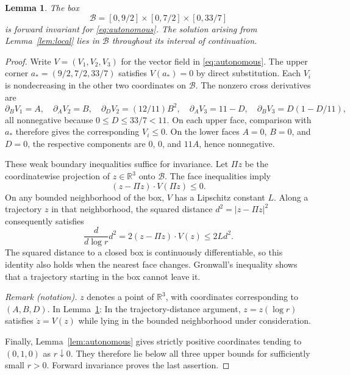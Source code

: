 \documentclass[11pt]{article}
\newcommand{\R}{\mathbb R}
\newtheorem{lemma}[theorem]{Lemma}
\theoremstyle{remark}
\begin{document}
\begin{lemma}\label{lem:box}
The box
\begin{equation}\label{eq:box}
 \mathcal B=[0,9/2]\times[0,7/2]\times[0,33/7]
\end{equation}
is forward invariant for \eqref{eq:autonomous}.
The solution arising from Lemma~\ref{lem:local} lies in
$\mathcal B$ throughout its interval of continuation.
\end{lemma}
\begin{proof}
Write $V=(V_1,V_2,V_3)$ for the vector field in
\eqref{eq:autonomous}.  The upper corner
$a_*=(9/2,7/2,33/7)$ satisfies $V(a_*)=0$ by direct substitution.
Each $V_i$ is nondecreasing in the other two coordinates on
$\mathcal B$.  The nonzero cross derivatives are
\[
 \partial_BV_1=A,\quad \partial_AV_2=B,\quad
 \partial_DV_2=(12/11)B^2,\quad
 \partial_AV_3=11-D,\quad
 \partial_BV_3=D(1-D/11),
\]
all nonnegative because $0\leq D\leq33/7<11$.
On each upper face, comparison with $a_*$ therefore gives
the corresponding $V_i\leq0$.
On the lower faces $A=0$, $B=0$, and $D=0$, the respective
components are $0$, $0$, and $11A$, hence nonnegative.

These weak boundary inequalities suffice for invariance.
Let $\Pi z$ be the coordinatewise projection of
$z\in\R^3$ onto $\mathcal B$.  The face inequalities imply
\[
 (z-\Pi z)\cdot V(\Pi z)\leq0.
\]
On any bounded neighborhood of the box, $V$ has a Lipschitz
constant $L$.  Along a trajectory $z$ in that neighborhood,
the squared distance $d^2=|z-\Pi z|^2$ consequently satisfies
\[
 \frac{d}{d\log r}d^2
 =2(z-\Pi z)\cdot V(z)\leq2L d^2.
\]
The squared distance to a closed box is continuously differentiable,
so this identity also holds when the nearest face changes.
Gronwall's inequality shows that a trajectory starting in the box
cannot leave it.

\noindent\textit{Remark (notation).} $z$ denotes a point of $\R^3$, with coordinates corresponding to $(A,B,D)$. In Lemma~\ref{lem:box}: In the trajectory-distance argument, $z=z(\log r)$ satisfies $\dot z=V(z)$ while lying in the bounded neighborhood under consideration.


Finally, Lemma~\ref{lem:autonomous} gives strictly positive
coordinates tending to $(0,1,0)$ as $r\downarrow0$.
They therefore lie below all three upper bounds for sufficiently
small $r>0$.  Forward invariance proves the last assertion.
\end{proof}
\end{document}

